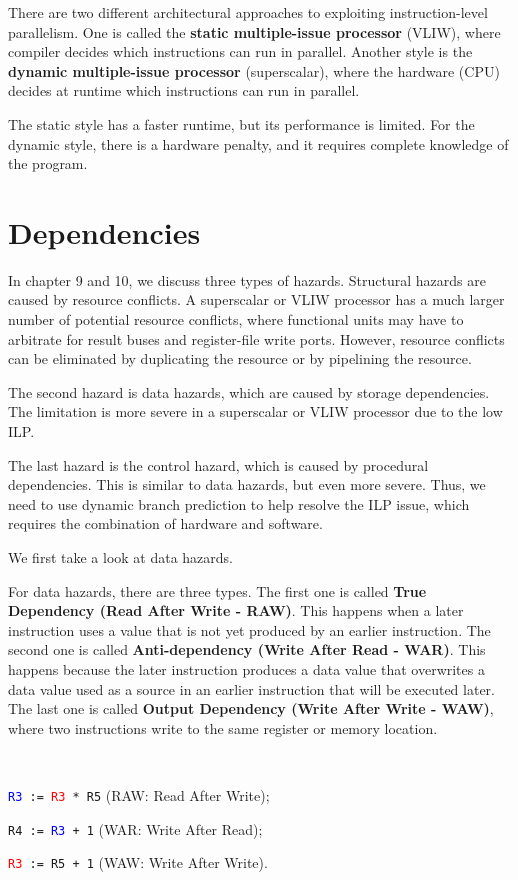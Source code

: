 There are two different architectural approaches to exploiting instruction-level parallelism. One is called the \textbf{static multiple-issue processor} (VLIW), where compiler decides which instructions can run in parallel. Another style is the \textbf{dynamic multiple-issue processor} (superscalar), where the hardware (CPU) decides at runtime which instructions can run in parallel.

The static style has a faster runtime, but its performance is limited. For the dynamic style, there is a hardware penalty, and it requires complete knowledge of the program.

\section{Dependencies}
In chapter 9 and 10, we discuss three types of hazards. Structural hazards are caused by resource conflicts. A superscalar or VLIW processor has a much larger number of potential resource conflicts, where functional units may have to arbitrate for result buses and register-file write ports. However, resource conflicts can be eliminated by duplicating the resource or by pipelining the resource.

The second hazard is data hazards, which are caused by storage dependencies. The limitation is more severe in a superscalar or VLIW processor due to the low ILP.

The last hazard is the control hazard, which is caused by procedural dependencies. This is similar to data hazards, but even more severe. Thus, we need to use dynamic branch prediction to help resolve the ILP issue, which requires the combination of hardware and software.

We first take a look at data hazards.

For data hazards, there are three types. The first one is called \textbf{True Dependency (Read After Write - RAW)}. This happens when a later instruction uses a value that is not yet produced by an earlier instruction. The second one is called \textbf{Anti-dependency (Write After Read - WAR)}. This happens because the later instruction produces a data value that overwrites a data value used as a source in an earlier instruction that will be executed later. The last one is called \textbf{Output Dependency (Write After Write - WAW)}, where two instructions write to the same register or memory location.


\begin{remark}~

  \texttt{\textcolor{blue}{R3} := \textcolor{red}{R3} * R5} (RAW: Read After Write);
  
  \texttt{R4 := \textcolor{blue}{R3} + 1} (WAR: Write After Read); 
  
  \texttt{\textcolor{red}{R3} := R5 + 1} (WAW: Write After Write).
\end{remark}

